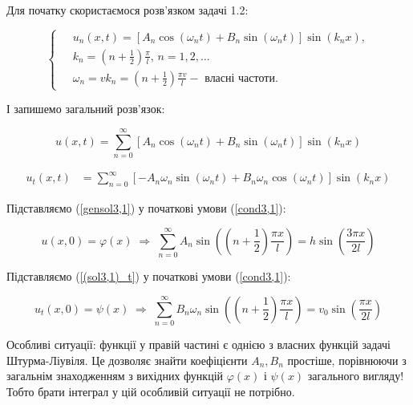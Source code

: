 Для початку скористаємося розв'язком задачі 1.2:

\begin{equation}
    \left\{ \begin{aligned} \label{mode3.1}
        \;&u_n(x,t) = \left[A_n\cos(\omega_n t) + B_n\sin(\omega_n t)\right] \sin(k_n x), \\
        &k_n = (n + \frac{1}{2})\frac{\pi}{l}, \, n = 1, 2,\ldots\\
        &\omega_n = vk_n = (n + \frac{1}{2})\frac{\pi v}{l} - \text{ власні частоти}.
    \end{aligned}\right.
\end{equation}

І запишемо загальний розв'язок:

\begin{equation} \label{gensol3,1}
    u(x,t) = \sum^{\infty}_{n=0} \left[A_n\cos(\omega_n t) + B_n\sin(\omega_n t)\right] \sin(k_n x)
\end{equation}

\begin{equation} \label{(sol3,1)_t}
    \begin{aligned}
        u_t(x,t) &= 
   \sum^{\infty}_{n=0}\left[-A_n\omega_n\sin(\omega_n t) + B_n\omega_n\cos(\omega_n t)\right] \sin(k_n x)  
    \end{aligned}
\end{equation}

Підставляємо (\ref{gensol3,1}) у початкові умови (\ref{cond3,1}):

\begin{equation}
    u(x,0) = \varphi(x) \;\Rightarrow\; \sum^{\infty}_{n=0} A_n\sin\left((n + \frac{1}{2}) \frac{\pi x}{l} \right) = h \sin \left( \frac{3 \pi x}{2l} \right)
\end{equation}


Підставляємо (\ref{(sol3,1)_t}) у початкові умови (\ref{cond3,1}):

\begin{equation}
    u_t(x,0) = \psi(x) \;\Rightarrow\; \sum^{\infty}_{n=0} B_n \omega_n \sin\left((n + \frac{1}{2}) \frac{\pi x}{l} \right) = v_0 \sin \left( \frac{ \pi x}{2l} \right)
\end{equation}

Особливі ситуації: функції у правій частині є однією з власних функцій задачі Штурма-Ліувіля. Це дозволяє знайти коефіцієнти $A_n, B_n$ простіше, порівнюючи з загальнім знаходженням з вихідних функцій $\varphi(x)$ і  $\psi(x)$ загального вигляду! Тобто брати інтеграл у цій особливій ситуації не потрібно.



